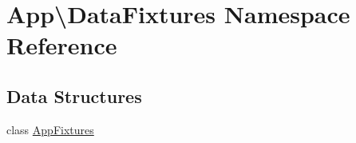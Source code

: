 \hypertarget{namespace_app_1_1_data_fixtures}{}\section{App\textbackslash{}Data\+Fixtures Namespace Reference}
\label{namespace_app_1_1_data_fixtures}
\subsection*{Data Structures}
\begin{DoxyCompactItemize}
\item 
class \mbox{\hyperlink{class_app_1_1_data_fixtures_1_1_app_fixtures}{App\+Fixtures}}
\end{DoxyCompactItemize}
